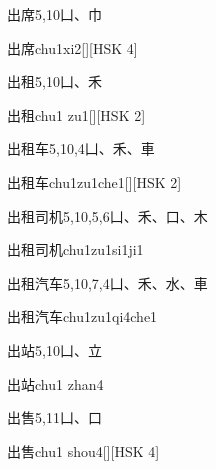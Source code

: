 \begin{entry}{出席}{5,10}{⼐、⼱}
  \begin{phonetics}{出席}{chu1xi2}[][HSK 4]
  \end{phonetics}
\end{entry}

\begin{entry}{出租}{5,10}{⼐、⽲}
  \begin{phonetics}{出租}{chu1 zu1}[][HSK 2]
  \end{phonetics}
\end{entry}

\begin{entry}{出租车}{5,10,4}{⼐、⽲、⾞}
  \begin{phonetics}{出租车}{chu1zu1che1}[][HSK 2]
  \end{phonetics}
\end{entry}

\begin{entry}{出租司机}{5,10,5,6}{⼐、⽲、⼝、⽊}
  \begin{phonetics}{出租司机}{chu1zu1si1ji1}
  \end{phonetics}
\end{entry}

\begin{entry}{出租汽车}{5,10,7,4}{⼐、⽲、⽔、⾞}
  \begin{phonetics}{出租汽车}{chu1zu1qi4che1}
  \end{phonetics}
\end{entry}

\begin{entry}{出站}{5,10}{⼐、⽴}
  \begin{phonetics}{出站}{chu1 zhan4}
  \end{phonetics}
\end{entry}

\begin{entry}{出售}{5,11}{⼐、⼝}
  \begin{phonetics}{出售}{chu1 shou4}[][HSK 4]
  \end{phonetics}
\end{entry}

